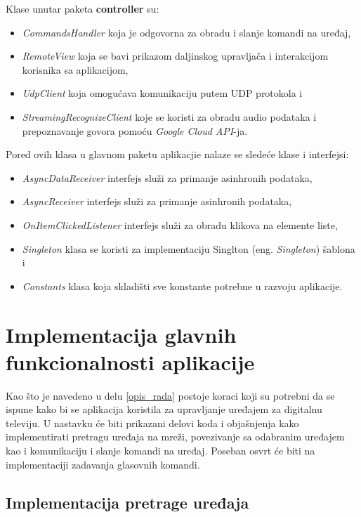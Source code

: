 \documentclass[implementacija.tex]{subfiles}
\begin{document}
Klase unutar paketa \textbf{controller} su:
\begin{itemize}
\item \textit{CommandsHandler} koja je odgovorna za obradu i slanje komandi na uređaj,
\item \textit{RemoteView} koja se bavi prikazom daljinskog upravljača i interakcijom korisnika sa aplikacijom,
\item \textit{UdpClient} koja omogućava komunikaciju putem UDP protokola i
\item \textit{StreamingRecognizeClient} koje se koristi za obradu audio podataka i prepoznavanje govora pomoću \textit{Google Cloud API}-ja. 
\end{itemize}


Pored ovih klasa u glavnom paketu aplikacjie nalaze se sledeće klase i interfejsi:
\begin{itemize}
\item \textit{AsyncDataReceiver} interfejs služi za primanje asinhronih podataka,
\item \textit{AsyncReceiver} interfejs služi za primanje asinhronih podataka,
\item \textit{OnItemClickedListener} interfejs služi za obradu klikova na elemente liste,
\item \textit{Singleton} klasa se koristi za implementaciju Singlton (eng. \textit{Singleton}) šablona i
\item \textit{Constants} klasa koja skladišti sve konstante potrebne u razvoju aplikacije.
\end{itemize}

\section{Implementacija glavnih funkcionalnosti aplikacije}
Kao što je navedeno u delu \ref{opis_rada} postoje koraci koji su potrebni da se ispune kako bi se aplikacija koristila za upravljanje uređajem za digitalnu televiju. U nastavku će biti prikazani delovi koda i objašnjenja kako implementirati pretragu uređaja na mreži, povezivanje sa odabranim uređajem kao i komunikaciju i slanje komandi na uređaj. Poseban osvrt će biti na implementaciji zadavanja glasovnih komandi. 

\subsection{Implementacija pretrage uređaja}

\end{document}
